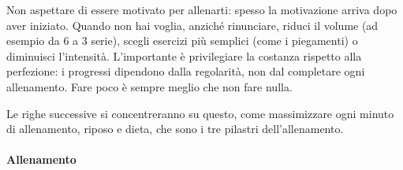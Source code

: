 \documentclass[12pt]{book} %
\begin{document}
Non aspettare di essere motivato per allenarti: spesso la motivazione arriva dopo aver iniziato. Quando non hai voglia, anziché rinunciare, riduci il volume (ad esempio da 6 a 3 serie), scegli esercizi più semplici (come i piegamenti) o diminuisci l'intensità. L'importante è privilegiare la costanza rispetto alla perfezione: i progressi dipendono dalla regolarità, non dal completare ogni allenamento. Fare poco è sempre meglio che non fare nulla. 

Le righe successive si concentreranno su questo, come massimizzare ogni minuto di allenamento, riposo e dieta, che sono i tre pilastri dell'allenamento.

\paragraph{Allenamento}
\end{document}
